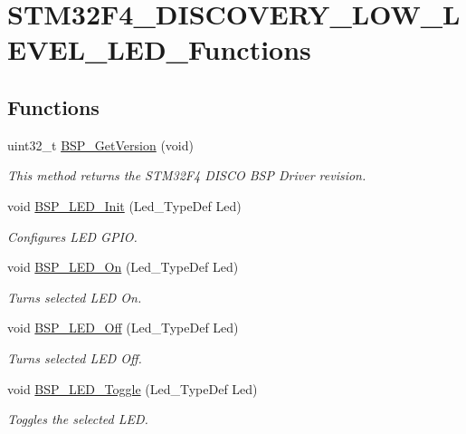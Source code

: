\hypertarget{group__STM32F4__DISCOVERY__LOW__LEVEL__LED__Functions}{\section{S\-T\-M32\-F4\-\_\-\-D\-I\-S\-C\-O\-V\-E\-R\-Y\-\_\-\-L\-O\-W\-\_\-\-L\-E\-V\-E\-L\-\_\-\-L\-E\-D\-\_\-\-Functions}
\label{group__STM32F4__DISCOVERY__LOW__LEVEL__LED__Functions}
}
\subsection*{Functions}
\begin{DoxyCompactItemize}
\item 
uint32\-\_\-t \hyperlink{group__STM32F4__DISCOVERY__LOW__LEVEL__LED__Functions_ga65d13608f7010a8068614154cb142cd6}{B\-S\-P\-\_\-\-Get\-Version} (void)
\begin{DoxyCompactList}\small\item\em This method returns the S\-T\-M32\-F4 D\-I\-S\-C\-O B\-S\-P Driver revision. \end{DoxyCompactList}\item 
void \hyperlink{group__STM32F4__DISCOVERY__LOW__LEVEL__LED__Functions_gab58a4f16a476a53653c5c400e3bed158}{B\-S\-P\-\_\-\-L\-E\-D\-\_\-\-Init} (Led\-\_\-\-Type\-Def Led)
\begin{DoxyCompactList}\small\item\em Configures L\-E\-D G\-P\-I\-O. \end{DoxyCompactList}\item 
void \hyperlink{group__STM32F4__DISCOVERY__LOW__LEVEL__LED__Functions_gaee9c16b16384834c69efabf58f423d6f}{B\-S\-P\-\_\-\-L\-E\-D\-\_\-\-On} (Led\-\_\-\-Type\-Def Led)
\begin{DoxyCompactList}\small\item\em Turns selected L\-E\-D On. \end{DoxyCompactList}\item 
void \hyperlink{group__STM32F4__DISCOVERY__LOW__LEVEL__LED__Functions_gaef268680154ca15c45066d64d41f9467}{B\-S\-P\-\_\-\-L\-E\-D\-\_\-\-Off} (Led\-\_\-\-Type\-Def Led)
\begin{DoxyCompactList}\small\item\em Turns selected L\-E\-D Off. \end{DoxyCompactList}\item 
void \hyperlink{group__STM32F4__DISCOVERY__LOW__LEVEL__LED__Functions_ga1b9eabba7d498f41d6f16587ec0f9732}{B\-S\-P\-\_\-\-L\-E\-D\-\_\-\-Toggle} (Led\-\_\-\-Type\-Def Led)
\begin{DoxyCompactList}\small\item\em Toggles the selected L\-E\-D. \end{DoxyCompactList}\end{DoxyCompactItemize}


